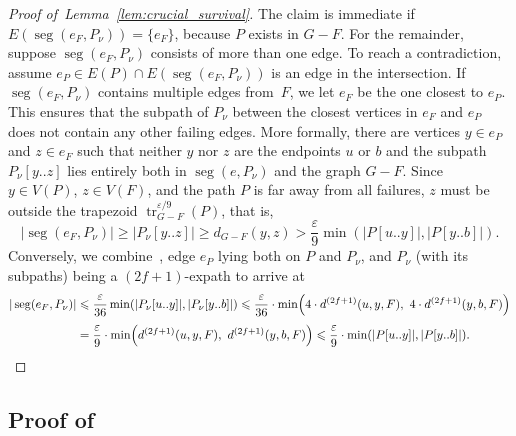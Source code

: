 \documentclass{theoretics}
\DeclareMathOperator{\tr}{tr}
\DeclareMathOperator{\seg}{seg}
\newcommand*{\length}[1]{|#1|}
\renewcommand{\le}{\leqslant}
\renewcommand{\ge}{\geqslant}
\newcommand{\eps}{\varepsilon}
\begin{document}
\begin{proof}[Proof of~Lemma~\ref{lem:crucial_survival}]
  The claim is immediate if $E(\seg(e_F,P_{\nu})) = \{e_F\}$, because $P$ exists in $G-F$.
  For the remainder, suppose $\seg(e_F,P_{\nu})$ consists of more than one edge.
  To reach a contradiction, assume $e_P \in E(P) \cap E(\seg(e_F,P_{\nu}))$
  is an edge in the intersection.
  If $\seg(e_F,P_{\nu})$ contains multiple edges from~$F$,
  we let $e_F$ be the one closest to $e_P$.
  This ensures that the subpath of $P_{\nu}$ between the closest vertices in $e_F$ and $e_P$ 
  does not contain any other failing edges.
  More formally, there are vertices $y \in e_P$ and $z \in e_F$
  such that neither $y$ nor $z$ are the endpoints $u$ or $b$ and
  the subpath $P_{\nu}[y..z]$ lies entirely both in $\seg(e,P_{\nu})$ and the graph $G-F$.
  Since $y \in V(P)$, $z \in V(F)$, 
  and the path $P$ is far away from all failures, 
  $z$ must be outside the trapezoid $\tr^{\eps/9}_{G-F}(P)$, that is,
  \begin{equation*}
    \length{\seg(e_F,P_{\nu})} \ge \length{P_{\nu}[y..z]} 
    \ge d_{G-F}(y,z) > \frac{\eps}{9} \min(\length{P[u..y]},\length{P[y..b]}).
  \end{equation*}
  Conversely, we combine~,
  edge $e_P$ lying both on $P$ and $P_{\nu}$,
  and $P_{\nu}$ (with its subpaths) being a $(2f{+}1)$-expath to arrive at
  \begin{align*}
    \length{\seg(e_F,P_{\nu})}
      &\le \frac{\eps}{36} \min(\length{P_{\nu}[u..y]}, \length{P_{\nu}[y..b]})
       \le \frac{\eps}{36} \cdot 
        \min\!\left(4 \cdot d^{(2f+1)}(u,y,F), \ 4 \cdot d^{(2f+1)}(y,b,F)\right)\\[.33em]
      &= \frac{\eps}{9} \cdot 
        \min\!\left(d^{(2f+1)}(u,y,F), \ d^{(2f+1)}(y,b,F)\right)
       \le \frac{\eps}{9} \cdot \min(\length{P[u..y]}, \length{P[y..b]}). \qedhere
  \end{align*}
\end{proof}


\subsection{Proof of \texorpdfstring{}{Lemma 5.1}}
\label{subsec:sublinear_wrapup}
\end{document}
